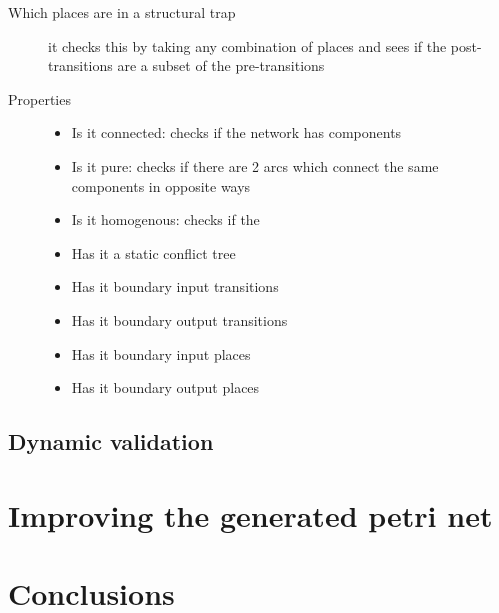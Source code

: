 \documentclass[12pt,a4paper,draft]{article}
\begin{document}
\begin{description}
    \item [Which places are in a structural trap] it checks this by taking any combination of places and sees if the post-transitions are a subset of the pre-transitions
    
    \item [Properties]
    
    \begin{itemize}
        \item Is it connected: checks if the network has components
        \item Is it pure: checks if there are 2 arcs which connect the same components in opposite ways
        \item Is it homogenous: checks if the
        \item Has it a static conflict tree
        \item Has it boundary input transitions
        \item Has it boundary output transitions
        \item Has it boundary input places
        \item Has it boundary output places
    \end{itemize}
    
    \end{description}
    

\subsection{Dynamic validation}\label{sec:dynamic_validation}

\section{Improving the generated petri net}\label{sec:improvments}


\section{Conclusions}\label{sec:conclusions}
    
\end{document}
